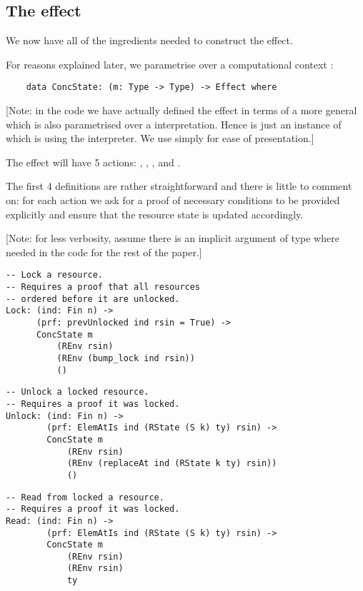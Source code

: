 \subsection{The effect}

We now have all of the ingredients needed to construct the
 effect.

For reasons explained later, we parametrise  over a
computational context :

\begin{BVerbatim}
    data ConcState: (m: Type -> Type) -> Effect where
\end{BVerbatim}

[Note: in the code we have actually defined the effect in terms of a more
general  which is also parametrised over a 
interpretation. Hence  is just an instance of
 which is using the  interpreter. We use
 simply for ease of presentation.]

The effect will have 5 actions: , , ,
 and .

The first 4 definitions are rather straightforward and there is little to
comment on: for each action we ask for a proof of necessary conditions to be
provided explicitly and ensure that the resource state is updated accordingly.

[Note: for less verbosity, assume there is an implicit argument  of
type  where needed in the code for the rest of the
paper.]

\begin{BVerbatim}
-- Lock a resource.
-- Requires a proof that all resources
-- ordered before it are unlocked.
Lock: (ind: Fin n) ->
      (prf: prevUnlocked ind rsin = True) ->
      ConcState m
          (REnv rsin)
          (REnv (bump_lock ind rsin))
          ()
\end{BVerbatim}

\begin{BVerbatim}
-- Unlock a locked resource.
-- Requires a proof it was locked.
Unlock: (ind: Fin n) ->
        (prf: ElemAtIs ind (RState (S k) ty) rsin) ->
        ConcState m
            (REnv rsin)
            (REnv (replaceAt ind (RState k ty) rsin))
            ()
\end{BVerbatim}

\begin{BVerbatim}
-- Read from locked a resource.
-- Requires a proof it was locked.
Read: (ind: Fin n) ->
        (prf: ElemAtIs ind (RState (S k) ty) rsin) ->
        ConcState m
            (REnv rsin)
            (REnv rsin)
            ty
\end{BVerbatim}

